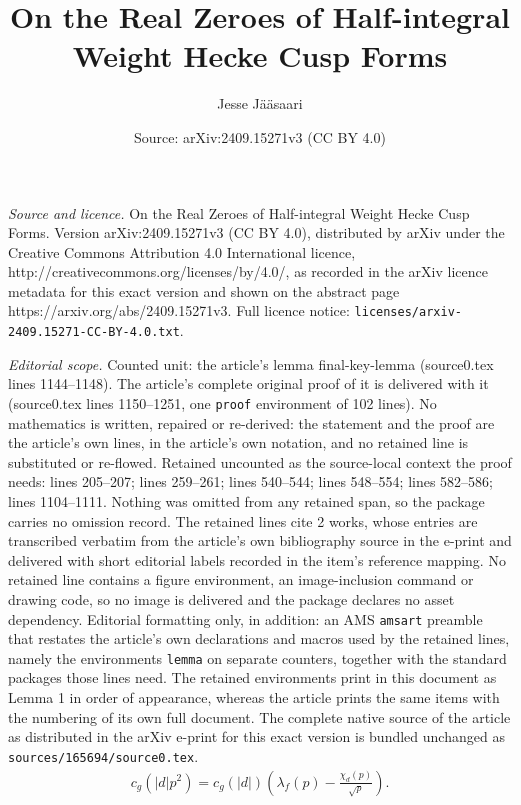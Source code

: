 \documentclass[10pt,a4paper]{amsart}
\title{On the Real Zeroes of Half-integral Weight Hecke Cusp Forms}
\author{Jesse J\"a\"asaari}
\date{Source: arXiv:2409.15271v3 (CC BY 4.0)}
\begin{document}
\maketitle

\noindent\emph{Source and licence.} On the Real Zeroes of Half-integral Weight Hecke Cusp Forms. Version arXiv:2409.15271v3 (CC BY 4.0), distributed by arXiv under the Creative Commons Attribution 4.0 International licence, http://creativecommons.org/licenses/by/4.0/, as recorded in the arXiv licence metadata for this exact version and shown on the abstract page https://arxiv.org/abs/2409.15271v3. Full licence notice: \texttt{licenses/arxiv-2409.15271-CC-BY-4.0.txt}.\par\smallskip

\noindent\textit{Editorial scope.} Counted unit: the article's lemma final-key-lemma (source0.tex lines 1144--1148). The article's complete original proof of it is delivered with it (source0.tex lines 1150--1251, one \texttt{proof} environment of 102 lines). No mathematics is written, repaired or re-derived: the statement and the proof are the article's own lines, in the article's own notation, and no retained line is substituted or re-flowed.  Retained uncounted as the source-local context the proof needs: lines 205--207; lines 259--261; lines 540--544; lines 548--554; lines 582--586; lines 1104--1111.  Nothing was omitted from any retained span, so the package carries no omission record.  The retained lines cite 2 works, whose entries are transcribed verbatim from the article's own bibliography source in the e-print and delivered with short editorial labels recorded in the item's reference mapping.  No retained line contains a figure environment, an image-inclusion command or drawing code, so no image is delivered and the package declares no asset dependency.  Editorial formatting only, in addition: an AMS \texttt{amsart} preamble that restates the article's own declarations and macros used by the retained lines, namely the environments \texttt{lemma} on separate counters, together with the standard packages those lines need.  The retained environments print in this document as Lemma 1 in order of appearance, whereas the article prints the same items with the numbering of its own full document.  The complete native source of the article as distributed in the arXiv e-print for this exact version is bundled unchanged as \texttt{sources/165694/source0.tex}.
\begin{align}\label{Fourier-coeff-rel}
c_g(|d|p^2)=c_g(|d|)\left(\lambda_f(p)-\frac{\chi_d(p)}{\sqrt p}\right).
\end{align}
\end{document}

